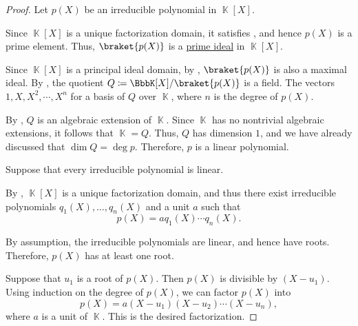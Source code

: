 \begin{proof}
   Let \( p(X) \) be an irreducible polynomial in \( \BbbK[X] \).

  Since \( \BbbK[X] \) is a unique factorization domain, it satisfies , and hence \( p(X) \) is a prime element. Thus, \( \braket {p(X)} \) is a \hyperref[def:semiring_ideal/prime]{prime ideal} in \( \BbbK[X] \).

  Since \( \BbbK[X] \) is a principal ideal domain, by , \( \braket{ p(X) } \) is also a maximal ideal. By , the quotient \( Q \coloneqq \BbbK[X] / \braket{ p(X) } \) is a field. The vectors \( 1, X, X^2, \cdots, X^n \) for a basis of \( Q \) over \( \BbbK \), where \( n \) is the degree of \( p(X) \).

  By , \( Q \) is an algebraic extension of \( \BbbK \). Since \( \BbbK \) has no nontrivial algebraic extensions, it follows that \( \BbbK = Q \). Thus, \( Q \) has dimension \( 1 \), and we have already discussed that \( \dim Q = \deg p \). Therefore, \( p \) is a linear polynomial.

   Suppose that every irreducible polynomial is linear.

  By , \( \BbbK[X] \) is a unique factorization domain, and thus there exist irreducible polynomials \( q_1(X), \ldots, q_n(X) \) and a unit \( a \) such that
  \begin{equation*}
    p(X) = a q_1(X) \cdots q_n(X).
  \end{equation*}

  By assumption, the irreducible polynomials are linear, and hence have roots. Therefore, \( p(X) \) has at least one root.

   Suppose that \( u_1 \) is a root of \( p(X) \). Then \( p(X) \) is divisible by \( (X - u_1) \). Using induction on the degree of \( p(X) \), we can factor \( p(X) \) into
  \begin{equation*}
    p(X) = a (X - u_1) (X - u_2) \cdots (X - u_n),
  \end{equation*}
  where \( a \) is a unit of \( \BbbK \). This is the desired factorization.


\end{proof}
